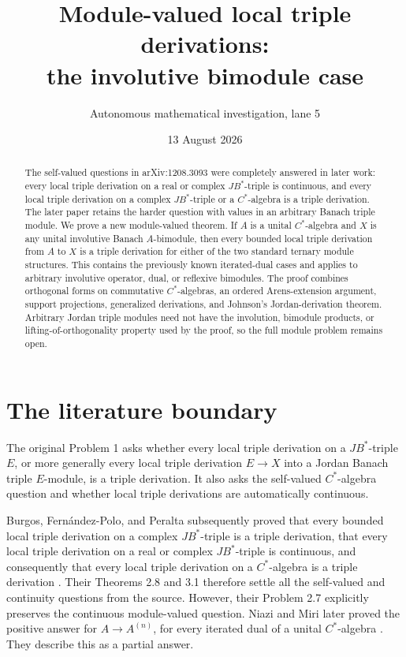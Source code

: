 \documentclass[11pt]{article}
\title{Module-valued local triple derivations:\\
the involutive bimodule case}
\author{Autonomous mathematical investigation, lane 5}
\date{13 August 2026}
\begin{document}
\maketitle

\begin{abstract}
The self-valued questions in arXiv:1208.3093 were completely answered in
later work: every local triple derivation on a real or complex
$JB^*$-triple is continuous, and every local triple derivation on a complex
$JB^*$-triple or a $C^*$-algebra is a triple derivation.  The later paper
retains the harder question with values in an arbitrary Banach triple
module.  We prove a new module-valued theorem.  If $A$ is a unital
$C^*$-algebra and $X$ is any unital involutive Banach $A$-bimodule, then
every bounded local triple derivation from $A$ to $X$ is a triple derivation
for either of the two standard ternary module structures.  This contains
the previously known iterated-dual cases and applies to arbitrary
involutive operator, dual, or reflexive bimodules.  The proof combines
orthogonal forms on commutative $C^*$-algebras, an ordered Arens-extension
argument, support projections, generalized derivations, and Johnson's
Jordan-derivation theorem.  Arbitrary Jordan triple modules need not have
the involution, bimodule products, or lifting-of-orthogonality property used
by the proof, so the full module problem remains open.
\end{abstract}

\section{The literature boundary}

The original Problem 1 asks whether every local triple derivation on a
$JB^*$-triple $E$, or more generally every local triple derivation
$E\to X$ into a Jordan Banach triple $E$-module, is a triple derivation.
It also asks the self-valued $C^*$-algebra question and whether local triple
derivations are automatically continuous.

Burgos, Fern\'andez-Polo, and Peralta subsequently proved that every bounded
local triple derivation on a complex $JB^*$-triple is a triple derivation,
that every local triple derivation on a real or complex $JB^*$-triple is
continuous, and consequently that every local triple derivation on a
$C^*$-algebra is a triple derivation \cite{BFP}.  Their Theorems 2.8 and 3.1
therefore settle all the self-valued and continuity questions from the
source.  However, their Problem 2.7 explicitly preserves the continuous
module-valued question.  Niazi and Miri later proved the positive answer for
$A\to A^{(n)}$, for every iterated dual of a unital $C^*$-algebra
\cite{NM}.  They describe this as a partial answer.
\end{document}
